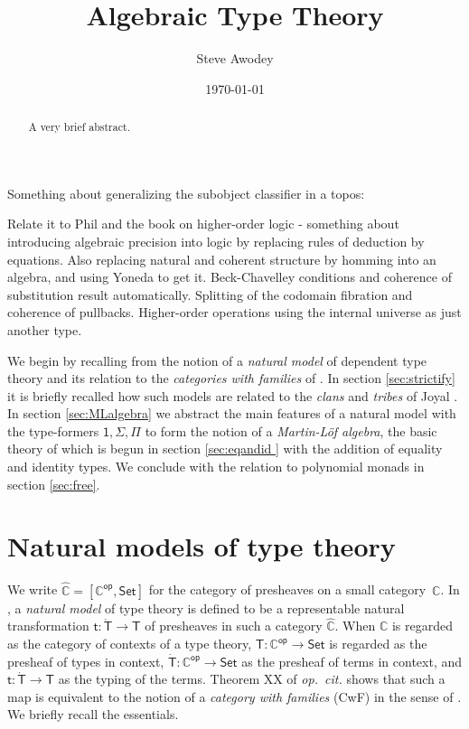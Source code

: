 \documentclass[12pt,reqno]{amsart}
\newcommand{\C}{\ensuremath{\mathbb{C}}}
\newcommand{\op}[1]{\ensuremath{{#1}^{\mathsf{op}}}}
\newcommand{\psh}[1]{\ensuremath{[\op{#1},\mathsf{Set}]}}
\newcommand{\Set}{\ensuremath{\mathsf{Set}}}
\renewcommand{\to}{\ensuremath{\rightarrow}}
\renewcommand{\t}{\ensuremath{\mathsf{t}}}
\newcommand{\T}{\ensuremath{\mathsf{T}}}
\newcommand{\TT}{\ensuremath{\dot{\mathsf{T}}}}
\theoremstyle{remark}
\theoremstyle{definition}
\begin{document}

\title{Algebraic Type Theory}
\author{Steve Awodey}
\date{\today}

\begin{abstract}
A very brief abstract.
\end{abstract}
\maketitle

Something about generalizing the subobject classifier in a topos: 

Relate it to Phil and the book on higher-order logic - something about introducing algebraic precision into logic by replacing rules of deduction by equations. Also replacing natural and coherent structure by homming into an algebra, and using Yoneda to get it.  Beck-Chavelley conditions and coherence of substitution result automatically.  Splitting of the codomain fibration and coherence of pullbacks.  Higher-order operations using the internal universe as just another type. 

We begin by recalling from \cite{awodey:NM} the notion of a \emph{natural model} of dependent type theory and its relation to the \emph{categories with families} of \cite{Dybjer:CWF}.  In section \ref{sec:strictify} it is briefly recalled how such models are related to the \emph{clans} and \emph{tribes} of Joyal \cite{Joyal:CandT}.  In section \ref{sec:MLalgebra} we abstract the main features of a natural model with the type-formers $\mathsf{1}, \Sigma, \Pi$ to form the notion of a \emph{Martin-L\"of algebra}, the basic theory of which is begun in section \ref{sec:eqandid } with the addition of equality and identity types.  We conclude with the relation to polynomial monads in section \ref{sec:free}. 

\section{Natural models of type theory}\label{sec:NaturalModels}

\noindent We write $\widehat{\C} = \psh{\C}$ for the category of presheaves on a small category~$\C$. 
In \cite{awodey:NM}, a \emph{natural model} of type theory is defined to be a representable natural transformation $\t: \TT\to \T$ of presheaves in such a category $\widehat{\C}$.  When $\C$ is regarded as the category of contexts of a type theory, $\T: \op{\C} \to \Set$ is regarded as the presheaf of types in context, $\TT: \op{\C} \to \Set$ as the presheaf of terms in context, and $\t : \TT\to\T$ as the typing of the terms.   Theorem XX of \emph{op.\ cit.} shows that such a map is equivalent to the notion of a \emph{category with families} (CwF) in the sense of \cite{Dybjer:CWF}.  We briefly recall the essentials.
\end{document}
